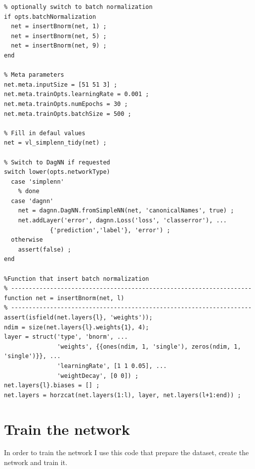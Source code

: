 \documentclass[]{report}
\begin{document}
\begin{lstlisting}
% optionally switch to batch normalization
if opts.batchNormalization
  net = insertBnorm(net, 1) ;
  net = insertBnorm(net, 5) ;
  net = insertBnorm(net, 9) ;
end

% Meta parameters
net.meta.inputSize = [51 51 3] ;
net.meta.trainOpts.learningRate = 0.001 ;
net.meta.trainOpts.numEpochs = 30 ;
net.meta.trainOpts.batchSize = 500 ;

% Fill in defaul values
net = vl_simplenn_tidy(net) ;

% Switch to DagNN if requested
switch lower(opts.networkType)
  case 'simplenn'
    % done
  case 'dagnn'
    net = dagnn.DagNN.fromSimpleNN(net, 'canonicalNames', true) ;
    net.addLayer('error', dagnn.Loss('loss', 'classerror'), ...
             {'prediction','label'}, 'error') ;
  otherwise
    assert(false) ;
end

%Function that insert batch normalization
% --------------------------------------------------------------------
function net = insertBnorm(net, l)
% --------------------------------------------------------------------
assert(isfield(net.layers{l}, 'weights'));
ndim = size(net.layers{l}.weights{1}, 4);
layer = struct('type', 'bnorm', ...
               'weights', {{ones(ndim, 1, 'single'), zeros(ndim, 1, 'single')}}, ...
               'learningRate', [1 1 0.05], ...
               'weightDecay', [0 0]) ;
net.layers{l}.biases = [] ;
net.layers = horzcat(net.layers(1:l), layer, net.layers(l+1:end)) ;

\end{lstlisting}

\section{Train the network}

In order to train the network I use this code that prepare the dataset, create the network and train it.
\end{document}
